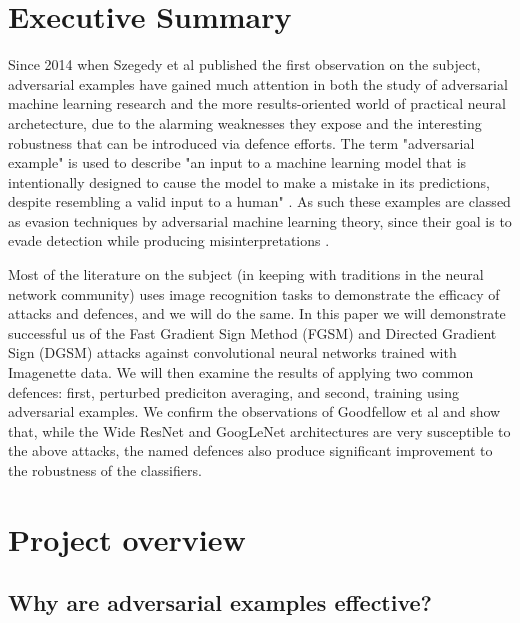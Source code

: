 \documentclass[conference]{IEEEtran}
\begin{document}
\tableofcontents%

\bigskip

\section{Executive Summary}

Since 2014 when Szegedy et al \cite{szegedy2014intriguing} published the
first observation on the subject, adversarial examples have gained much
attention in both the study of adversarial machine learning research and the
more results-oriented world of practical neural archetecture, due to the
alarming weaknesses they expose and the interesting robustness that can be
introduced via defence efforts. The term "adversarial example" is used to
describe "an input to a machine learning model that is intentionally
designed to cause the model to make a mistake in its predictions, despite
resembling a valid input to a human" \cite{wiyatno2019adversarial}. As such
these examples are classed as evasion techniques by adversarial machine
learning theory, since their goal is to evade detection while producing
misinterpretations \cite{wiki:aml}. 

Most of the literature on the subject (in keeping with traditions in the
neural network community) uses image recognition tasks to demonstrate the
efficacy of attacks and defences, and we will do the same. In this paper we
will demonstrate successful us of the Fast Gradient Sign Method (FGSM)  \cite%
{goodfellow2014explaining} and Directed Gradient Sign (DGSM) \cite%
{madry2020adversarial} attacks against convolutional neural networks trained
with Imagenette data. We will then examine the results of applying two
common defences: first, perturbed prediciton averaging, and second, training
using adversarial examples. We confirm the observations of Goodfellow et al 
\cite{goodfellow2014explaining} and show that, while the Wide ResNet and
GoogLeNet architectures are very susceptible to the above attacks, the named
defences also produce significant improvement to the robustness of the
classifiers.  

\section{Project overview}

\subsection{Why are adversarial examples effective?}
\end{document}
